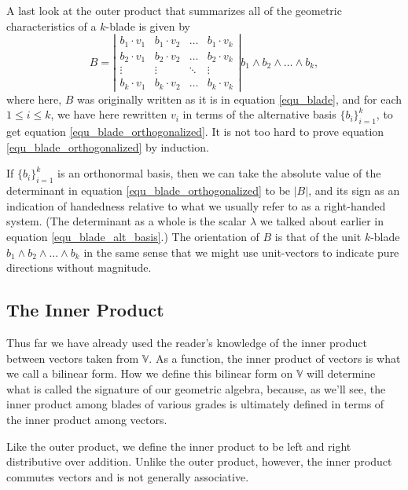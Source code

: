 \documentclass[12pt]{article}
\numberwithin{equation}{section}
\newcommand{\V}{\mathbb{V}}
\begin{document}
A last look at the outer product that summarizes all of the geometric characteristics of a $k$-blade
is given by
\begin{equation}\label{equ_blade_orthogonalized}
B = \left|\begin{array}{cccc}
b_1\cdot v_1 & b_1\cdot v_2 & \dots & b_1\cdot v_k \\
b_2\cdot v_1 & b_2\cdot v_2 & \dots & b_2\cdot v_k \\
\vdots & \vdots & \ddots & \vdots \\
b_k\cdot v_1 & b_k\cdot v_2 & \dots & b_k\cdot v_k
\end{array}\right|b_1\wedge b_2\wedge\dots\wedge b_k,
\end{equation}
where here, $B$ was originally written as it is in equation \eqref{equ_blade}, and
for each $1\leq i\leq k$, we have here rewritten $v_i$ in terms of the alternative basis $\{b_i\}_{i=1}^k$,
to get equation \eqref{equ_blade_orthogonalized}.  It is not too hard to
prove equation \eqref{equ_blade_orthogonalized} by induction.

If $\{b_i\}_{i=1}^k$ is an orthonormal basis,
then we can take the absolute value of the determinant in equation
\eqref{equ_blade_orthogonalized} to be $|B|$, and its sign as an
indication of handedness relative to what we usually refer to as a right-handed system.
(The determinant as a whole is the scalar $\lambda$ we talked about earlier in
equation \eqref{equ_blade_alt_basis}.)
The orientation of $B$ is that of the unit $k$-blade $b_1\wedge b_2\wedge\dots\wedge b_k$
in the same sense that we might use unit-vectors to indicate pure directions without magnitude.

\subsection{The Inner Product}

Thus far we have already used the reader's knowledge of the inner product
between vectors taken from $\V$.  As a function, the inner product of vectors is
what we call a bilinear form.  How we define this bilinear form on $\V$ will determine
what is called the signature of our geometric algebra, because, as we'll see,
the inner product among blades of various grades is ultimately defined
in terms of the inner product among vectors.

Like the outer product, we define the inner product to be left and
right distributive over addition.  Unlike the outer product, however,
the inner product commutes vectors and is not generally associative.
\end{document}
